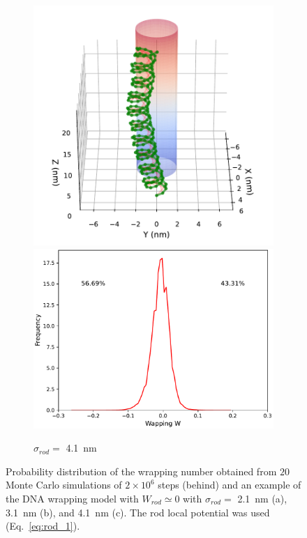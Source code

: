 \documentclass[a4paper,10pt]{article}
\begin{document}
\begin{figure}[tb]
\begin{subfigure}{.3\textwidth}
\includegraphics[width=\textwidth]{r1_C_2000000_7.pdf}
\includegraphics[width=\textwidth]{r1_C_wr_pr.pdf}
\caption{$\sigma_{rod}=$ \SI{4.1}{\nm}}
\label{fig:r1_c}
\end{subfigure}
\caption{Probability distribution of the wrapping number obtained from $20$ Monte Carlo simulations of $2\times 10^6$ steps (behind) and an example of the DNA wrapping model with $W_{rod}\simeq 0$ with $\sigma_{rod}=$ \SI{2.1}{\nm} (a), \SI{3.1}{\nm} (b), and \SI{4.1}{\nm} (c). The rod local potential was used (Eq.~\ref{eq:rod_1}).}
\label{fig:r1}
\end{figure}
\end{document}
